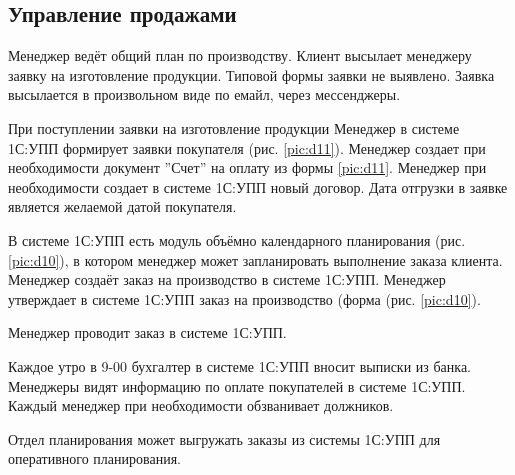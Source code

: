 \newpage
\subsection{Управление продажами}
\label{bp:SalesManagment}


Менеджер  ведёт общий план по производству. 
Клиент высылает менеджеру заявку на изготовление продукции. 
Типовой формы заявки не выявлено.
Заявка высылается в произвольном виде по емайл, через мессенджеры. 



При поступлении заявки на изготовление продукции Менеджер в системе 1С:УПП формирует заявки покупателя (рис. \ref{pic:d11}). Менеджер создает при необходимости документ ''Счет'' на оплату из формы \ref{pic:d11}. 
Менеджер при необходимости создает в системе 1С:УПП новый договор.
Дата отгрузки в заявке является желаемой датой покупателя. 

В системе 1С:УПП есть модуль объёмно календарного планирования (рис. \ref{pic:d10}), в котором менеджер может запланировать выполнение заказа клиента.
Менеджер создаёт заказ на производство в системе 1С:УПП.
 Менеджер утверждает  в системе 1С:УПП заказ на производство (форма (рис. \ref{pic:d10}).

Менеджер проводит заказ в системе 1С:УПП.

Каждое утро в 9-00 бухгалтер в системе 1С:УПП вносит выписки из банка.
Менеджеры видят информацию по оплате покупателей в системе 1С:УПП. Каждый менеджер при необходимости обзванивает должников. 

Отдел планирования может выгружать заказы из системы 1С:УПП для оперативного планирования.




